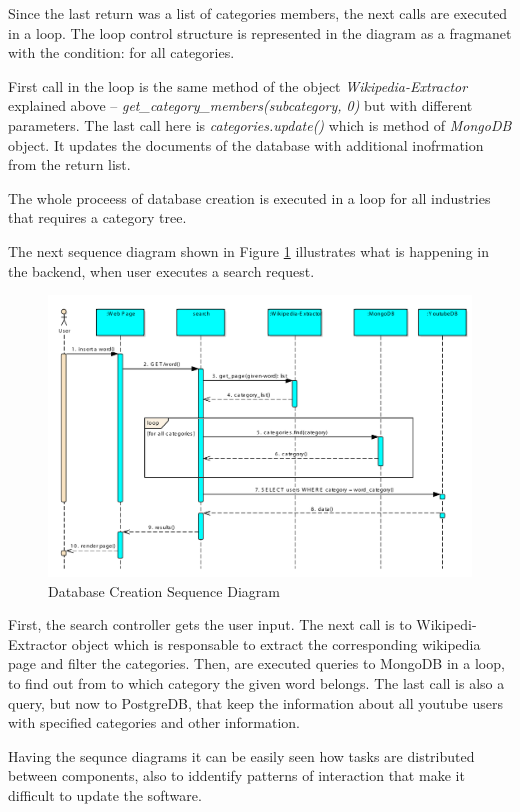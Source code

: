 Since the last return was a list of categories members, the next calls are executed in a loop. The loop control structure is represented in the diagram as a fragmanet with the condition: for all categories. 

First call in the loop is the same method of the object \textit{Wikipedia-Extractor} explained above -- \textit{get\_category\_members(subcategory, 0)} but with different parameters. The last call here is \textit{categories.update()} which is method of \textit{MongoDB} object. It updates the documents of the database with additional inofrmation from the return list. 

The whole proceess of database creation is executed in a loop for all industries that requires a category tree. 

The next sequence diagram shown in Figure \ref{mapreduce_uml} illustrates what is happening in the backend, when user executes a search request.

\begin{figure}[!ht]
\centering
\includegraphics[width=15cm]{SearchDB}
\caption{Database Creation Sequence Diagram}\label{mapreduce_uml}
\end{figure}

First, the search controller gets the user input. The next call is to Wikipedi-Extractor object which is responsable to extract the corresponding wikipedia page and filter the categories. Then, are executed queries to MongoDB in a loop, to find out from to which category the given word belongs. The last call is also a query, but now to PostgreDB, that keep the information about all youtube users with specified categories and other information.

Having the sequnce diagrams it can be easily seen how tasks are distributed between components, also to iddentify patterns of interaction that make it difficult to update the software.

